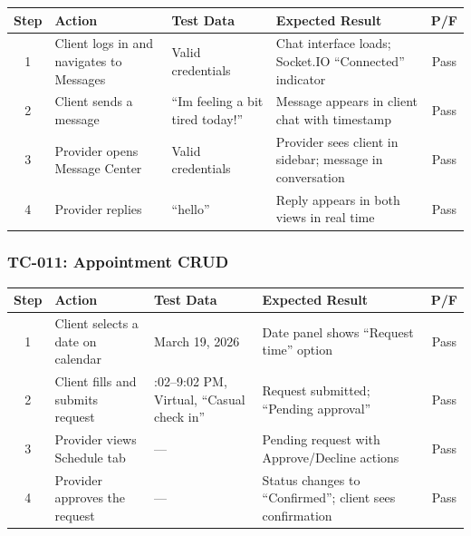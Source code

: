 \documentclass[12pt,letterpaper]{article}
\begin{document}
\begin{table}[!htbp]
\centering
\small
\begin{tabularx}{\textwidth}{|c|>{\raggedright\arraybackslash}X|>{\raggedright\arraybackslash}p{3cm}|>{\raggedright\arraybackslash}X|c|}
\hline
\rowcolor{TableHeader}\textcolor{TableHeaderText}{\textbf{Step}} & \textcolor{TableHeaderText}{\textbf{Action}} & \textcolor{TableHeaderText}{\textbf{Test Data}} & \textcolor{TableHeaderText}{\textbf{Expected Result}} & \textcolor{TableHeaderText}{\textbf{P/F}} \\
\hline
1 & Client logs in and navigates to Messages & Valid credentials & Chat interface loads; Socket.IO ``Connected'' indicator & Pass \\
\hline
\rowcolor{TableRowAlt}
2 & Client sends a message & ``Im feeling a bit tired today!'' & Message appears in client chat with timestamp & Pass \\
\hline
3 & Provider opens Message Center & Valid credentials & Provider sees client in sidebar; message in conversation & Pass \\
\hline
\rowcolor{TableRowAlt}
4 & Provider replies & ``hello'' & Reply appears in both views in real time & Pass \\
\hline
\end{tabularx}
\end{table}

\subsubsection*{TC-011: Appointment CRUD}

\begin{table}[!htbp]
\centering
\small
\begin{tabularx}{\textwidth}{|c|>{\raggedright\arraybackslash}X|>{\raggedright\arraybackslash}p{3cm}|>{\raggedright\arraybackslash}X|c|}
\hline
\rowcolor{TableHeader}\textcolor{TableHeaderText}{\textbf{Step}} & \textcolor{TableHeaderText}{\textbf{Action}} & \textcolor{TableHeaderText}{\textbf{Test Data}} & \textcolor{TableHeaderText}{\textbf{Expected Result}} & \textcolor{TableHeaderText}{\textbf{P/F}} \\
\hline
1 & Client selects a date on calendar & March 19, 2026 & Date panel shows ``Request time'' option & Pass \\
\hline
\rowcolor{TableRowAlt}
2 & Client fills and submits request & 7:02--9:02 PM, Virtual, ``Casual check in'' & Request submitted; ``Pending approval'' & Pass \\
\hline
3 & Provider views Schedule tab & --- & Pending request with Approve/Decline actions & Pass \\
\hline
\rowcolor{TableRowAlt}
4 & Provider approves the request & --- & Status changes to ``Confirmed''; client sees confirmation & Pass \\
\hline
\end{tabularx}
\end{table}
\end{document}
